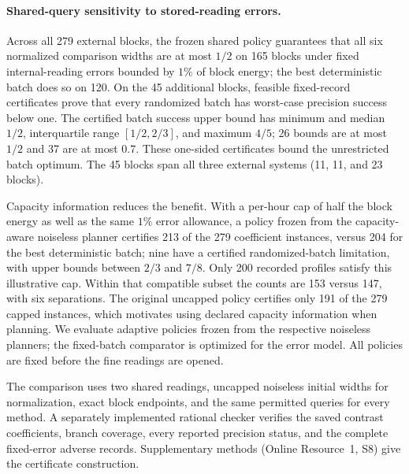 \paragraph{Shared-query sensitivity to stored-reading errors.}
Across all 279 external blocks, the frozen shared policy guarantees that
all six normalized comparison widths are at most $1/2$ on 165 blocks under
fixed internal-reading errors bounded by $1\%$ of block energy; the best
deterministic batch does so on 120.  On the 45 additional blocks,
feasible fixed-record certificates prove that every randomized batch has
worst-case precision success below one.  The certified batch success
upper bound has minimum and median $1/2$, interquartile range
$[1/2,2/3]$, and maximum $4/5$; 26 bounds are at most $1/2$ and 37 are
at most $0.7$. These one-sided certificates bound the unrestricted batch
optimum. The 45 blocks span all three
external systems (11, 11, and 23 blocks).

Capacity information reduces the benefit.  With a per-hour cap of half
the block energy as well as the same $1\%$ error allowance, a policy
frozen from the capacity-aware noiseless planner certifies 213 of the
279 coefficient instances, versus 204 for the best deterministic batch;
nine have a certified randomized-batch limitation, with upper bounds
between $2/3$ and $7/8$.  Only 200 recorded profiles satisfy this illustrative
cap.  Within that compatible subset the counts are 153 versus 147, with
six separations.  The original uncapped policy certifies only 191 of the
279 capped instances, which motivates using declared capacity information
when planning. We evaluate adaptive policies frozen from the respective
noiseless planners; the fixed-batch comparator is optimized for the error
model. All policies are fixed before the fine readings are opened.

The comparison uses two shared readings, uncapped noiseless initial widths for
normalization, exact block endpoints, and the same permitted queries for
every method.  A separately implemented rational checker verifies the
saved contrast coefficients, branch coverage, every reported precision
status, and the complete fixed-error adverse records.  Supplementary
methods (Online Resource~1, S8) give the certificate construction.
